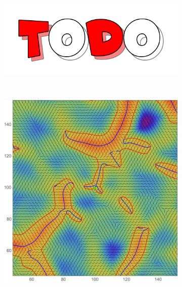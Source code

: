 \documentclass[a4paper, 11pt]{article}
\begin{document}
\begin{figure}
\begin{subfigure}[b]{0.3\textwidth}
\end{subfigure}~
\begin{subfigure}[b]{0.3\textwidth}
\includegraphics[width=\textwidth]{Todo}
\end{subfigure}\\
\begin{subfigure}[b]{0.3\textwidth}
\includegraphics[width=\textwidth]{Hyperbolic_L}
\end{subfigure}~
\begin{subfigure}[b]{0.3\textwidth}

\end{subfigure}
\end{figure}
\end{document}

